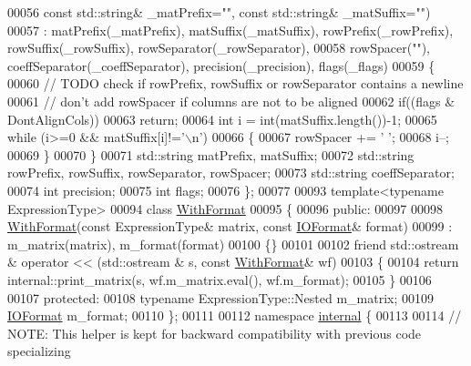 \begin{DoxyCode}
00056     \textcolor{keyword}{const} std::string& \_matPrefix=\textcolor{stringliteral}{""}, \textcolor{keyword}{const} std::string& \_matSuffix=\textcolor{stringliteral}{""})
00057   : matPrefix(\_matPrefix), matSuffix(\_matSuffix), rowPrefix(\_rowPrefix), rowSuffix(\_rowSuffix), 
      rowSeparator(\_rowSeparator),
00058     rowSpacer(\textcolor{stringliteral}{""}), coeffSeparator(\_coeffSeparator), precision(\_precision), flags(\_flags)
00059   \{
00060     \textcolor{comment}{// TODO check if rowPrefix, rowSuffix or rowSeparator contains a newline}
00061     \textcolor{comment}{// don't add rowSpacer if columns are not to be aligned}
00062     \textcolor{keywordflow}{if}((flags & DontAlignCols))
00063       \textcolor{keywordflow}{return};
00064     \textcolor{keywordtype}{int} i = int(matSuffix.length())-1;
00065     \textcolor{keywordflow}{while} (i>=0 && matSuffix[i]!=\textcolor{charliteral}{'\(\backslash\)n'})
00066     \{
00067       rowSpacer += \textcolor{charliteral}{' '};
00068       i--;
00069     \}
00070   \}
00071   std::string matPrefix, matSuffix;
00072   std::string rowPrefix, rowSuffix, rowSeparator, rowSpacer;
00073   std::string coeffSeparator;
00074   \textcolor{keywordtype}{int} precision;
00075   \textcolor{keywordtype}{int} flags;
00076 \};
00077 
00093 \textcolor{keyword}{template}<\textcolor{keyword}{typename} ExpressionType>
00094 \textcolor{keyword}{class }\hyperlink{group___core___module_class_eigen_1_1_with_format}{WithFormat}
00095 \{
00096   \textcolor{keyword}{public}:
00097 
00098     \hyperlink{group___core___module_class_eigen_1_1_with_format}{WithFormat}(\textcolor{keyword}{const} ExpressionType& matrix, \textcolor{keyword}{const} \hyperlink{group___core___module_struct_eigen_1_1_i_o_format}{IOFormat}& format)
00099       : m\_matrix(matrix), m\_format(format)
00100     \{\}
00101 
00102     \textcolor{keyword}{friend} std::ostream & operator << (std::ostream & s, \textcolor{keyword}{const} \hyperlink{group___core___module_class_eigen_1_1_with_format}{WithFormat}& wf)
00103     \{
00104       \textcolor{keywordflow}{return} internal::print\_matrix(s, wf.m\_matrix.eval(), wf.m\_format);
00105     \}
00106 
00107   \textcolor{keyword}{protected}:
00108     \textcolor{keyword}{typename} ExpressionType::Nested m\_matrix;
00109     \hyperlink{group___core___module_struct_eigen_1_1_i_o_format}{IOFormat} m\_format;
00110 \};
00111 
00112 \textcolor{keyword}{namespace }\hyperlink{namespaceinternal}{internal} \{
00113 
00114 \textcolor{comment}{// NOTE: This helper is kept for backward compatibility with previous code specializing}

\end{DoxyCode}
